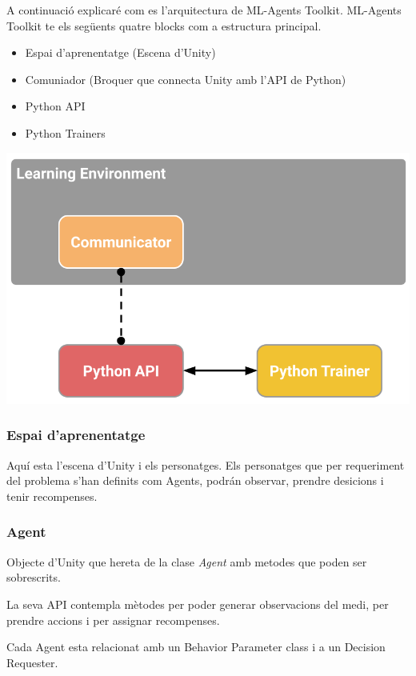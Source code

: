 \documentclass{article}
\begin{document}
    A continuació explicaré com es l'arquitectura de ML-Agents Toolkit. ML-Agents Toolkit te els següents quatre blocks com a estructura principal.
    
    \begin{itemize}
        \item Espai d'aprenentatge (Escena d'Unity)
        \item Comuniador (Broquer que connecta Unity amb l'API de Python)
        \item Python API
        \item Python Trainers
    \end{itemize}

    \includegraphics[width=\textwidth]{images/learning_environment_basic.png}
    
    \newpage
    
    \subsubsection{Espai d'aprenentatge}
    Aquí esta l’escena d’Unity i els personatges. Els personatges que per requeriment del problema s’han definits com Agents, podrán observar, prendre desicions i tenir recompenses.
    
    \subsubsection{Agent}
    Objecte d'Unity que hereta de la clase \textit{Agent} amb metodes que poden ser sobrescrits. 
    
    La seva API contempla mètodes per poder generar observacions del medi, per prendre accions i per assignar recompenses.
    
    Cada Agent esta relacionat amb un Behavior Parameter class i a un Decision Requester.
    
\end{document}
